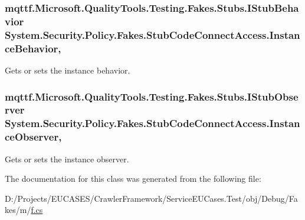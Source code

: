 \hypertarget{class_system_1_1_security_1_1_policy_1_1_fakes_1_1_stub_code_connect_access_a5e74803b4d45952d3dfbca5c33da4ed6}{
\subsubsection[{Instance\-Behavior}]{\setlength{\rightskip}{0pt plus 5cm}mqttf.\-Microsoft.\-Quality\-Tools.\-Testing.\-Fakes.\-Stubs.\-I\-Stub\-Behavior System.\-Security.\-Policy.\-Fakes.\-Stub\-Code\-Connect\-Access.\-Instance\-Behavior\hspace{0.3cm}{\ttfamily [get]}, {\ttfamily [set]}}}\label{class_system_1_1_security_1_1_policy_1_1_fakes_1_1_stub_code_connect_access_a5e74803b4d45952d3dfbca5c33da4ed6}


Gets or sets the instance behavior.

\hypertarget{class_system_1_1_security_1_1_policy_1_1_fakes_1_1_stub_code_connect_access_ad7c6dbd37247a42f01ff8df0903f9348}{
\subsubsection[{Instance\-Observer}]{\setlength{\rightskip}{0pt plus 5cm}mqttf.\-Microsoft.\-Quality\-Tools.\-Testing.\-Fakes.\-Stubs.\-I\-Stub\-Observer System.\-Security.\-Policy.\-Fakes.\-Stub\-Code\-Connect\-Access.\-Instance\-Observer\hspace{0.3cm}{\ttfamily [get]}, {\ttfamily [set]}}}\label{class_system_1_1_security_1_1_policy_1_1_fakes_1_1_stub_code_connect_access_ad7c6dbd37247a42f01ff8df0903f9348}


Gets or sets the instance observer.



The documentation for this class was generated from the following file\-:\begin{DoxyCompactItemize}
\item 
D\-:/\-Projects/\-E\-U\-C\-A\-S\-E\-S/\-Crawler\-Framework/\-Service\-E\-U\-Cases.\-Test/obj/\-Debug/\-Fakes/m/\hyperlink{m_2f_8cs}{f.\-cs}\end{DoxyCompactItemize}
